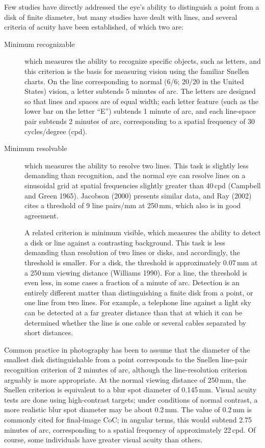 \documentclass[11pt, oneside]{scrartcl}   	%
\begin{document}
Few studies have directly addressed the eye’s ability to distinguish a point from a disk of finite diameter, but many studies have dealt with lines, and several criteria of acuity have been established, of which two are:
\begin{description}
\item [Minimum recognizable] which measures the ability to recognize
  specific objects, such as letters, and this criterion is the basis
  for measuring vision using the familiar Snellen charts. On the line
  corresponding to normal (6/6; 20/20 in the United States) vision,
  a letter subtends 5 minutes of arc. The letters are designed so that
  lines and spaces are of equal width; each letter feature (such as
  the  lower bar on the letter “E”) subtends 1 minute of arc, and each
  line-space pair subtends 2 minutes of arc, corresponding to a
  spatial  frequency of 30\,cycles/degree (cpd).
\item [Minimum resolvable] which measures the ability to resolve two
  lines. This task is slightly less demanding than recognition, and
  the normal eye can resolve lines on a sinusoidal grid at spatial
  frequencies slightly greater than 40\,cpd (Campbell and Green 1965).
  Jacobson (2000) presents similar data, and Ray (2002) cites a
  threshold of 9 line pairs/mm at 250\,mm, which also is in good
  agreement.
  
A related criterion is minimum visible, which measures the ability to detect a disk or line against a contrasting background. This task is less demanding than resolution of two lines or disks, and accordingly, the threshold is smaller. For a disk, the threshold is approximately 0.07\,mm at a 250\,mm viewing distance (Williams 1990). For a line, the threshold is even less, in some cases a fraction of a minute of arc. Detection is an entirely different matter than distinguishing a finite disk from a point, or one line from two lines. For example, a telephone line against a light sky can be detected at a far greater distance than that at which it can be determined whether the line is one cable or several cables separated by short distances.
\end{description}

Common practice in photography has been to assume that the diameter of the smallest disk distinguishable from a point corresponds to the Snellen line-pair recognition criterion of 2 minutes of arc, although the line-resolution criterion arguably is more appropriate. At the normal viewing distance of 250\,mm, the Snellen criterion is equivalent to a blur spot diameter of 0.145\,mm. Visual acuity tests are done using high-contrast targets; under conditions of normal contrast, a more realistic blur spot diameter may be about 0.2\,mm. The value of 0.2\,mm is commonly cited for final-image CoC; in angular terms, this would subtend 2.75 minutes of arc, corresponding to a spatial frequency of approximately 22\,cpd. Of course, some individuals have greater visual acuity than others.
\end{document}
